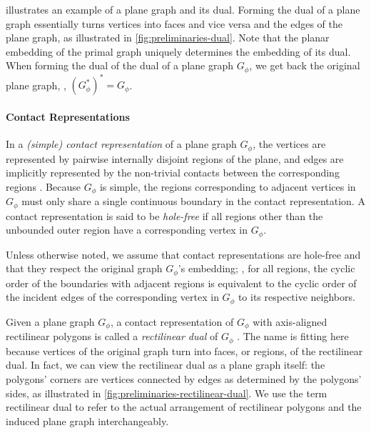  illustrates an example of a plane graph and its dual.
Forming the dual of a plane graph essentially turns vertices into faces and vice versa and  the edges of the plane graph, as illustrated in \cref{fig:preliminaries-dual}.
Note that the planar embedding of the primal graph uniquely determines the embedding of its dual.
When forming the dual of the dual of a plane graph $G_\phi$, we get back the original plane graph, \ie{}, $(G_\phi^*)^* = G_\phi$.



\paragraph{Contact Representations}

In a \emph{(simple) contact representation} of a plane graph $G_\phi$, the vertices are represented by pairwise internally disjoint regions of the plane, and edges are implicitly represented by the non-trivial contacts between the corresponding regions \cite{alam2013linear}.
Because $G_\phi$ is simple, the regions corresponding to adjacent vertices in $G_\phi$ must only share a single continuous boundary in the contact representation.
A contact representation is said to be \emph{hole-free} if all regions other than the unbounded outer region have a corresponding vertex in $G_\phi$.

Unless otherwise noted, we assume that contact representations are hole-free and that they respect the original graph $G_\phi$'s embedding; \ie{}, for all regions, the cyclic order of the boundaries with adjacent regions is equivalent to the cyclic order of the incident edges of the corresponding vertex in $G_\phi$ to its respective neighbors.

Given a plane graph $G_\phi$, a contact representation of $G_\phi$ with axis-aligned rectilinear polygons is called a \emph{rectilinear dual} of $G_\phi$ \cite{alam2013computing}.
The name  is fitting here because vertices of the original graph turn into faces, or regions, of the rectilinear dual.
In fact, we can view the rectilinear dual as a plane graph itself: the polygons' corners are vertices connected by edges as determined by the polygons' sides, as illustrated in \cref{fig:preliminaries-rectilinear-dual}.
We use the term rectilinear dual to refer to the actual arrangement of rectilinear polygons and the induced plane graph interchangeably.

